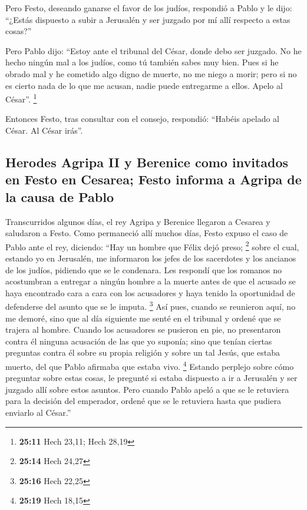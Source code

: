  Pero Festo, deseando ganarse el favor de los judíos,
respondió a Pablo y le dijo: ``¿Estás dispuesto a subir a Jerusalén y
ser juzgado por mí allí respecto a estas cosas?''

 Pero Pablo dijo: ``Estoy ante el tribunal del César,
donde debo ser juzgado. No he hecho ningún mal a los judíos, como tú
también sabes muy bien.  Pues si he obrado mal y he
cometido algo digno de muerte, no me niego a morir; pero si no es cierto
nada de lo que me acusan, nadie puede entregarme a ellos. Apelo al
César''. \footnote{\textbf{25:11} Hech 23,11; Hech 28,19}

 Entonces Festo, tras consultar con el consejo,
respondió: ``Habéis apelado al César. Al César irás''.

\hypertarget{herodes-agripa-ii-y-berenice-como-invitados-en-festo-en-cesarea-festo-informa-a-agripa-de-la-causa-de-pablo}{%
\subsection{Herodes Agripa II y Berenice como invitados en Festo en
Cesarea; Festo informa a Agripa de la causa de
Pablo}\label{herodes-agripa-ii-y-berenice-como-invitados-en-festo-en-cesarea-festo-informa-a-agripa-de-la-causa-de-pablo}}

 Transcurridos algunos días, el rey Agripa y Berenice
llegaron a Cesarea y saludaron a Festo.  Como permaneció
allí muchos días, Festo expuso el caso de Pablo ante el rey, diciendo:
``Hay un hombre que Félix dejó preso; \footnote{\textbf{25:14} Hech
  24,27}  sobre el cual, estando yo en Jerusalén, me
informaron los jefes de los sacerdotes y los ancianos de los judíos,
pidiendo que se le condenara.  Les respondí que los
romanos no acostumbran a entregar a ningún hombre a la muerte antes de
que el acusado se haya encontrado cara a cara con los acusadores y haya
tenido la oportunidad de defenderse del asunto que se le imputa.
\footnote{\textbf{25:16} Hech 22,25}  Así pues, cuando se
reunieron aquí, no me demoré, sino que al día siguiente me senté en el
tribunal y ordené que se trajera al hombre.  Cuando los
acusadores se pusieron en pie, no presentaron contra él ninguna
acusación de las que yo suponía;  sino que tenían ciertas
preguntas contra él sobre su propia religión y sobre un tal Jesús, que
estaba muerto, del que Pablo afirmaba que estaba vivo. \footnote{\textbf{25:19}
  Hech 18,15}  Estando perplejo sobre cómo preguntar
sobre estas cosas, le pregunté si estaba dispuesto a ir a Jerusalén y
ser juzgado allí sobre estos asuntos.  Pero cuando Pablo
apeló a que se le retuviera para la decisión del emperador, ordené que
se le retuviera hasta que pudiera enviarlo al César.''

